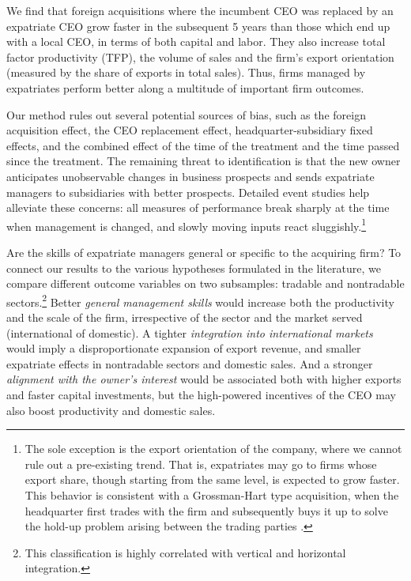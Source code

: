 \documentclass[12pt,a4paper]{article}
\begin{document}
We find that foreign acquisitions where the incumbent CEO was replaced by an expatriate CEO grow faster in the subsequent 5 years than those which end up with a local CEO, in terms of both capital and labor. They also increase total factor productivity (TFP), the volume of sales and the firm's export orientation (measured by the share of exports in total sales). Thus, firms managed by expatriates perform better along a multitude of important firm outcomes.

Our method rules out several potential sources of bias, such as the foreign acquisition effect, the CEO replacement effect, headquarter-subsidiary fixed effects, and the combined effect of the time of the treatment and the time passed since the treatment. The remaining threat to identification is that the new owner anticipates unobservable changes in business prospects and sends expatriate managers to subsidiaries with better prospects. Detailed event studies help alleviate these concerns: all measures of performance break sharply at the time when management is changed, and slowly moving inputs react sluggishly.\footnote{The sole exception is the export orientation of the company, where we cannot rule out a pre-existing trend. That is, expatriates may go to firms whose export share, though starting from the same level, is expected to grow faster. This behavior is consistent with a Grossman-Hart type acquisition, when the headquarter first trades with the firm and subsequently buys it up to solve the hold-up problem arising between the trading parties \citep{grossman1986costs}.} 

Are the skills of expatriate managers general or specific to the acquiring firm? To connect our results to the various hypotheses formulated in the literature, we compare different outcome variables on two subsamples: tradable and nontradable sectors.\footnote{This classification is highly correlated with vertical and horizontal integration.} Better \emph{general management skills} would increase both the productivity and the scale of the firm, irrespective of the sector and the market served (international of domestic). A tighter \emph{integration into international markets} would imply a disproportionate expansion of export revenue, and smaller expatriate effects in nontradable sectors and domestic sales. And a stronger \emph{alignment with the owner's interest} would be associated both with higher exports and faster capital investments, but the high-powered incentives of the CEO may also boost productivity and domestic sales.
\end{document}
